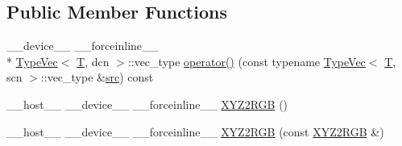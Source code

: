 \subsection*{Public Member Functions}
\begin{DoxyCompactItemize}
\item 
\-\_\-\-\_\-device\-\_\-\-\_\- \-\_\-\-\_\-forceinline\-\_\-\-\_\- \\*
\hyperlink{structcv_1_1gpu_1_1device_1_1TypeVec}{Type\-Vec}$<$ \hyperlink{calib3d_8hpp_a3efb9551a871ddd0463079a808916717}{T}, dcn $>$\-::vec\-\_\-type \hyperlink{structcv_1_1gpu_1_1device_1_1color__detail_1_1XYZ2RGB_a1c504213d7399b4431800108b49ab79c}{operator()} (const typename \hyperlink{structcv_1_1gpu_1_1device_1_1TypeVec}{Type\-Vec}$<$ \hyperlink{calib3d_8hpp_a3efb9551a871ddd0463079a808916717}{T}, scn $>$\-::vec\-\_\-type \&\hyperlink{legacy_8hpp_a371cd109b74033bc4366f584edd3dacc}{src}) const 
\item 
\-\_\-\-\_\-host\-\_\-\-\_\- \-\_\-\-\_\-device\-\_\-\-\_\- \-\_\-\-\_\-forceinline\-\_\-\-\_\- \hyperlink{structcv_1_1gpu_1_1device_1_1color__detail_1_1XYZ2RGB_afeaf07d23516ce26fc3665e881c63789}{X\-Y\-Z2\-R\-G\-B} ()
\item 
\-\_\-\-\_\-host\-\_\-\-\_\- \-\_\-\-\_\-device\-\_\-\-\_\- \-\_\-\-\_\-forceinline\-\_\-\-\_\- \hyperlink{structcv_1_1gpu_1_1device_1_1color__detail_1_1XYZ2RGB_abb1f843136f05d9a8ef8004f14203438}{X\-Y\-Z2\-R\-G\-B} (const \hyperlink{structcv_1_1gpu_1_1device_1_1color__detail_1_1XYZ2RGB}{X\-Y\-Z2\-R\-G\-B} \&)
\end{DoxyCompactItemize}


